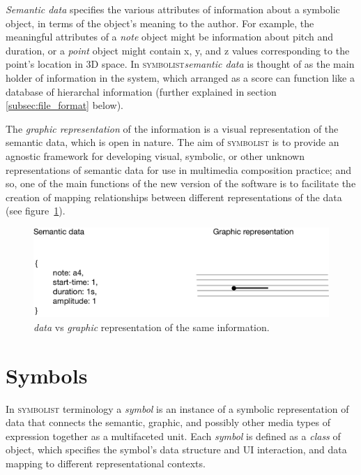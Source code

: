 \documentclass{article}
\def\symbolist{\textsc{symbolist}\xspace}
\begin{document}
\textit{Semantic data} specifies the various attributes of information about a symbolic object, in terms of the object's meaning to the author. 
For example, the meaningful attributes of a \textit{note} object might be information about pitch and duration, or a \textit{point} object might contain x, y, and z values corresponding to the point's location in 3D space. In \symbolist \textit{semantic data} is thought of as the main holder of information in the system, which arranged as a score can function like a database of hierarchal information (further explained in section \ref{subsec:file_format} below).

The \textit{graphic representation} of the information is a visual representation of the semantic data, which is open in nature. The aim of \symbolist is to provide an agnostic framework for developing visual, symbolic, or other unknown representations of semantic data for use in multimedia composition practice; and so, one of the main functions of the new version of the software is to facilitate the creation of mapping relationships between different representations of the data (see figure~\ref{fig:graphic-representation}).


\begin{figure}[ht!]
\centering
\includegraphics[width=1\columnwidth]{graphic-representation.pdf}
\caption{\textit{data} vs \textit{graphic} representation of the same information.
\label{fig:graphic-representation}}
\end{figure}



\section{Symbols}\label{subsec:symbols}

In \symbolist terminology a \textit{symbol} is an instance of a symbolic representation of data that connects the semantic, graphic, and possibly other media types of expression together as a multifaceted unit.
Each \textit{symbol} is defined as a \textit{class} of object, which specifies the symbol's data structure and UI interaction, and data mapping to different representational contexts.
\end{document}
